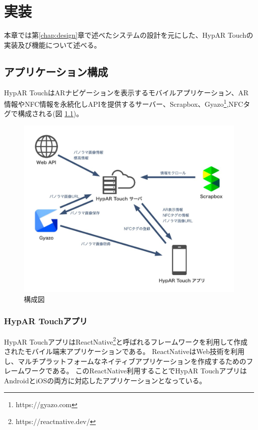 \chapter{実装}
\label{chap:implementation}

本章では第\ref{chap:design}章で述べたシステムの設計を元にした、HypAR Touchの実装及び機能について述べる。

\newpage

\section{アプリケーション構成}
HypAR TouchはARナビゲーションを表示するモバイルアプリケーション、AR情報やNFC情報を永続化しAPIを提供するサーバー、Scrapbox、Gyazo\footnote{\textsf{https://gyazo.com}},NFCタグで構成される(図 \ref{fig:application_structure})。

\begin{figure}[h]
  \centering
  \includegraphics[width=150mm]{images/application_structure.jpg}
  \caption{構成図} \label{fig:application_structure}
\end{figure}

\subsection{HypAR Touchアプリ}
HypAR TouchアプリはReactNative\footnote{\textsf{https://reactnative.dev/}}と呼ばれるフレームワークを利用して作成されたモバイル端末アプリケーションである。
ReactNativeはWeb技術を利用し、マルチプラットフォームなネイティブアプリケーションを作成するためのフレームワークである。
このReactNative利用することでHypAR TouchアプリはAndroidとiOSの両方に対応したアプリケーションとなっている。

